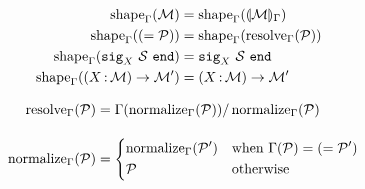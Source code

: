 \begin{figure}[tbp]
  \vspace{-3mm}
  \caption{Lookup rules -- $\lookup{\E}{\ip} = \iM$}
  \label{module:lookup}

  \begin{subfigure}[t]{0.5\linewidth}
    \begin{align*}
      \operatorname{shape}_{\Gamma}(\mathcal M) &= \operatorname{shape}_{\Gamma}(\llparenthesis \mathcal M \rrparenthesis_{\Gamma})\\
      \operatorname{shape}_{\Gamma}((= \mathcal P)) &= \operatorname{shape}_{\Gamma}(\operatorname{resolve}_{\Gamma}(\mathcal P))\\
      \operatorname{shape}_{\Gamma}(\mathtt{sig}_{X}\ \mathcal S\ \mathtt{end}) &= \mathtt{sig}_{X}\ \mathcal S\ \mathtt{end}\\
      \operatorname{shape}_{\Gamma}((X \operatorname{:} \mathcal M) \to \mathcal M') &= (X \operatorname{:} \mathcal M) \to \mathcal M'
    \end{align*}
  \end{subfigure}
  \begin{subfigure}[t]{0.5\linewidth}
    \begin{align*}
      \operatorname{resolve}_{\Gamma}(\mathcal P)
      &= \Gamma(\operatorname{normalize}_{\Gamma}(\mathcal P))/\operatorname{normalize}_{\Gamma}(\mathcal P)
      \\[1em]
      \operatorname{normalize}_{\Gamma}(\mathcal P)
      &=
        \begin{dcases}
          \operatorname{normalize}_{\Gamma}(\mathcal P') & \text{when } \Gamma(\mathcal P) = (= \mathcal P') \\
          \mathcal P & \text{otherwise}
        \end{dcases}
    \end{align*}
  \end{subfigure}

\end{figure}



